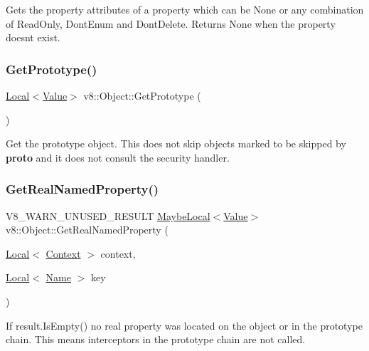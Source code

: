 Gets the property attributes of a property which can be None or any combination of Read\+Only, Dont\+Enum and Dont\+Delete. Returns None when the property doesn\textquotesingle{}t exist. \mbox{\label{classv8_1_1Object_ae8d3fed7d6dbd667c29cabb3039fe7af}} 
\subsubsection{\texorpdfstring{Get\+Prototype()}{GetPrototype()}}
{\footnotesize\ttfamily \mbox{\hyperlink{classv8_1_1Local}{Local}}$<$\mbox{\hyperlink{classv8_1_1Value}{Value}}$>$ v8\+::\+Object\+::\+Get\+Prototype (\begin{DoxyParamCaption}{ }\end{DoxyParamCaption})}

Get the prototype object. This does not skip objects marked to be skipped by {\bfseries proto} and it does not consult the security handler. \mbox{\label{classv8_1_1Object_aecec39cefb3e394e1696fe618862efec}} 
\subsubsection{\texorpdfstring{Get\+Real\+Named\+Property()}{GetRealNamedProperty()}}
{\footnotesize\ttfamily V8\+\_\+\+W\+A\+R\+N\+\_\+\+U\+N\+U\+S\+E\+D\+\_\+\+R\+E\+S\+U\+LT \mbox{\hyperlink{classv8_1_1MaybeLocal}{Maybe\+Local}}$<$\mbox{\hyperlink{classv8_1_1Value}{Value}}$>$ v8\+::\+Object\+::\+Get\+Real\+Named\+Property (\begin{DoxyParamCaption}\item[{\mbox{\hyperlink{classv8_1_1Local}{Local}}$<$ \mbox{\hyperlink{classv8_1_1Context}{Context}} $>$}]{context,  }\item[{\mbox{\hyperlink{classv8_1_1Local}{Local}}$<$ \mbox{\hyperlink{classv8_1_1Name}{Name}} $>$}]{key }\end{DoxyParamCaption})}

If result.\+Is\+Empty() no real property was located on the object or in the prototype chain. This means interceptors in the prototype chain are not called. \mbox{\label{classv8_1_1Object_a476c21f05ffc519252fad0ab46de33d7}} 
